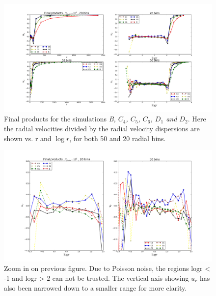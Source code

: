 \begin{figure}
\centering
\includegraphics[width=1.0\linewidth]{img/BC4C5C6D1D2_r_logr_ur_mean_timemax_4600.png}
\caption{Final products for the simulations \emph{B, $C_4$, $C_5$, $C_6$, $D_1$ and $D_2$}.
Here the radial velocities divided by the radial velocity dispersions are shown vs. r and $\log r $, for both 50 and 20 radial bins. }
\label{fig:test}
\end{figure}

\begin{figure}
\centering
\includegraphics[width=1.0\linewidth]{img/BC4C5C6D1D2_logr_ur_mean_timemax_4600_zoom.png}
\caption{Zoom in on previous figure. Due to Poisson noise, the regions logr < -1 and logr > 2 can not be trusted. The vertical axis showing $u_r$ has also been narrowed down to a smaller range for more clarity.}
\label{fig:test}
\end{figure}
